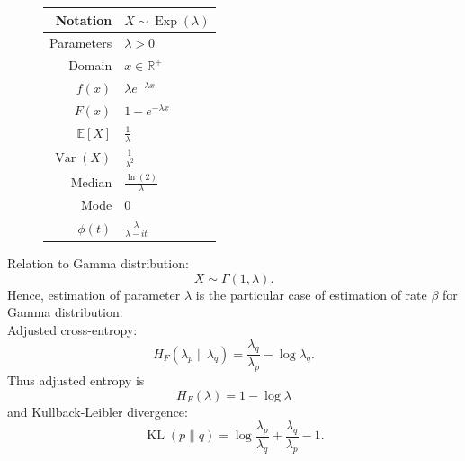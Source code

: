 \documentclass[a4paper,11pt]{article}
\theoremstyle{plain}
\theoremstyle{definition}
\newcommand{\ME}{\mathbb{E}}
\newcommand{\MR}{\mathbb{R}}
\newcommand{\Var}{\operatorname{Var}}
\begin{document}
\begin{figure}[!htb]
\begin{minipage}{0.55\textwidth}
		\end{minipage}
		\begin{minipage}{0.4\textwidth}
		\begin{tabular}{| r | l |}
			\hline
			Notation & $X \sim \operatorname{Exp}(\lambda)$ \\
			\hline
			Parameters & $\lambda > 0$ \\
			\hline
			Domain & $x \in \MR^+$  \\
			\hline
			$f(x)$ & $\lambda e^{-\lambda x}  $ \\
			\hline
			$F(x)$ & $1-e^{-\lambda x} $\\
			\hline
			$\ME[X]$ & $ \frac{1}{\lambda}$ \\
			\hline
			$\Var(X)$ & $\frac{1}{\lambda^2}$ \\
			\hline
			Median & $\frac{\ln(2)}{\lambda}$ \\
			\hline
			Mode & $0$ \\
			\hline
			$\phi(t)$ & $ \frac{\lambda}{\lambda-it}$ \\
			\hline
		\end{tabular}
		\end{minipage}
	\end{figure}

	Relation to Gamma distribution:
	\[X \sim \Gamma(1, \lambda).\]
	Hence, estimation of parameter $\lambda$ is the particular case of estimation of rate $\beta$ for Gamma distribution. \\
	Adjusted cross-entropy:
	\[
	H_F(\lambda_p \| \lambda_q) = \frac{\lambda_q}{\lambda_p}-\log \lambda_q. 
	\]
	Thus adjusted entropy is
	\[
	H_F(\lambda) = 1 - \log \lambda
	\]
	and Kullback-Leibler divergence:
	\[
	\operatorname{KL}(p \| q) = \log \frac{\lambda_p}{\lambda_q} + \frac{\lambda_q}{\lambda_p} - 1.
	\]
	
	\pagebreak
\end{document}

